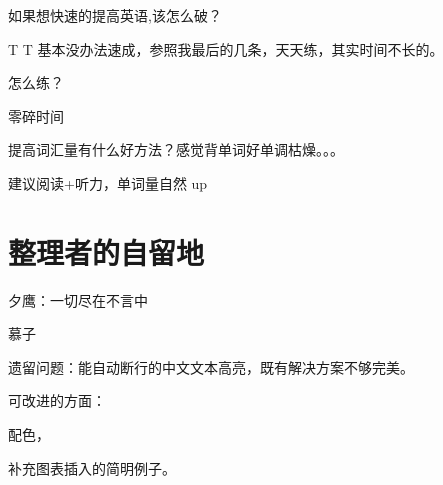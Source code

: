 \documentclass[a4paper,12pt]{ctexart}
\begin{document}
\begin{question}[土木 3-乔 21:19:26]
  如果想快速的提高英语,该怎么破？
  
  \answer T T 基本没办法速成，参照我最后的几条，天天练，其实时间不长的。
\end{question}

\begin{postquestion}[临床医学-2-兔子]
  怎么练？
  
  \postanswer 零碎时间
\end{postquestion}

\begin{question}[电路与系统 1-郁 21:21:43]
  提高词汇量有什么好方法？感觉背单词好单调枯燥。{}。{}。
  
  \answer 建议阅读+听力，单词量自然 up
\end{question}

\section{整理者的自留地}
夕鹰：一切尽在不言中

\bigskip
\noindent 慕子

遗留问题：能自动断行的中文文本高亮，既有解决方案不够完美。

可改进的方面：
\begin{enumerate*}[i)]
	\item 配色，
	\item 补充图表插入的简明例子。
\end{enumerate*}
\end{document}
